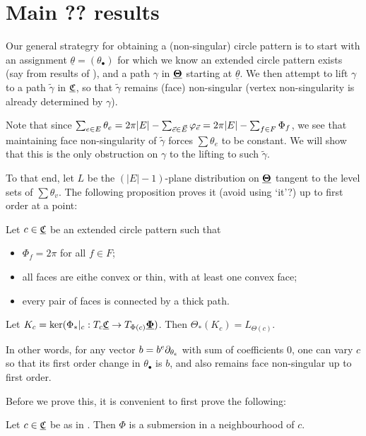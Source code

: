 \section{Main ?? results}


Our general strategry for obtaining a (non-singular) circle pattern
is to start with an assignment $\underline{\theta} = (\theta_\bullet)$
for which we know an extended circle pattern exists
(say from results of ),
and a path $\gamma$ in ${\underline{\mathbf{\Theta}}}$ starting at $\underline{\theta}$.
We then attempt to lift $\gamma$ to a path $\tilde{\gamma}$ in ${\underline{\mathfrak{C}}}$,
so that $\tilde{\gamma}$ remains (face) non-singular
(vertex non-singularity is already determined by $\gamma$).

Note that since $\sum_{e\in E} \theta_e
= 2\pi |E| - \sum_{\vec{e} \in \vec{E}} \varphi_{\vec{e}}
= 2\pi |E| - \sum_{f\in F} \Phi_f$,
we see that maintaining face non-singularity of $\tilde{\gamma}$
forces $\sum \theta_e$ to be constant.
We will show that this is the only obstruction on $\gamma$
to the lifting to such $\tilde{\gamma}$.

To that end, let $L$ be the $(|E|-1)$-plane distribution on ${\underline{\mathbf{\Theta}}}$
tangent to the level sets of $\sum \theta_v$.
The following proposition proves it (avoid using `it'?) up to first order at a point:


\begin{proposition}
\label{p:point_lift}
Let $c \in {\underline{\mathfrak{C}}}$ be an extended circle pattern such that
\begin{itemize}
	\item $\Phi_f = 2\pi$ for all $f\in F$;
	\item all faces are eithe convex or thin,
		with at least one convex face;
	\item every pair of faces is connected by a thick path.
\end{itemize}
Let $K_c = \ker (\Phi_*|_c : T_c {\underline{\mathfrak{C}}} \to T_{\Phi(c)} {\underline{\mathbf{\Phi}}})$.
Then $\Theta_*(K_c) = L_{\Theta(c)}$.

In other words, for any vector $b = b^e \partial_{\theta_e}$
with sum of coefficients 0, one can vary $c$ so that its
first order change in $\theta_\bullet$ is $b$,
and also remains face non-singular up to first order.
\end{proposition}


Before we prove this, it is convenient to first prove the following:

\begin{lemma}
Let $c \in {\underline{\mathfrak{C}}}$ be as in .
Then $\Phi$ is a submersion in a neighbourhood of $c$.
\end{lemma}

